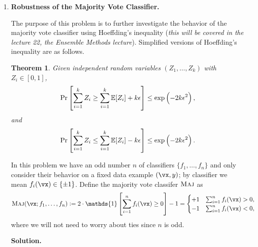 \documentclass{article}
\def\eps{\epsilon}
\def\1{\mathds{1}}
\newtheorem{theorem}{Theorem}
\theoremstyle{definition}
\theoremstyle{remark}
\newenvironment{Q}
{%
\clearpage
\item
}
{%
\phantom{s}%
\bigskip%
\noindent\textbf{Solution.}
}
\begin{document}
\begin{enumerate}[font={\Large\bfseries},left=0pt]
\begin{enumerate}
\end{enumerate}
 
\begin{Q}
  \textbf{\Large Robustness of the Majority Vote Classifier.}\\
  \def\maj{\textsc{Maj}}

   
   The purpose of this problem is to further investigate the behavior of the majority vote classifier using Hoeffding's inequality (\textit{this will be covered in the lecture 22, the Ensemble Methods lecture}).  Simplified versions of Hoeffding's inequality are as follows.
    \begin{theorem}\label{thm: hoeffding}
      Given independent random variables $(Z_1,\ldots,Z_k)$ with $Z_i \in [0,1]$,
        \begin{equation}\label{eq: hoeffding 1}
          \Pr\sbr{\sum_{i=1}^k Z_i \geq  \sum_{i=1}^k\mathbb{E}[Z_i] + k\eps } \leq \exp\del{-2k\eps^2},
        \end{equation}
        and
        \begin{equation}\label{eq: hoeffding 2}
          \Pr\sbr{\sum_{i=1}^k Z_i \leq  \sum_{i=1}^k\mathbb{E}[Z_i] - k\eps } \leq \exp\del{-2k\eps^2}.
        \end{equation}
    \end{theorem}

    In this problem we have an odd number $n$ of classifiers $\{f_1,\ldots,f_n\}$
    and only consider their behavior
    on a fixed data example $(\vx,y)$; by classifier we mean $f_i(\vx) \in \{\pm 1\}$.
    Define the majority vote classifer $\maj$ as
    \[
      \maj(\vx;f_1,\ldots,f_n)
      := 2\cdot \1\sbr{\sum_{i=1}^n f_i(\vx) \geq 0 } - 1
      = \begin{cases}
          +1 &\sum_{i=1}^n f_i(\vx) > 0, \\
          -1 &\sum_{i=1}^n f_i(\vx) < 0,
        \end{cases}
    \]
    where we will not need to worry about ties since $n$ is odd.


\end{Q}
\end{enumerate}
\end{document}
